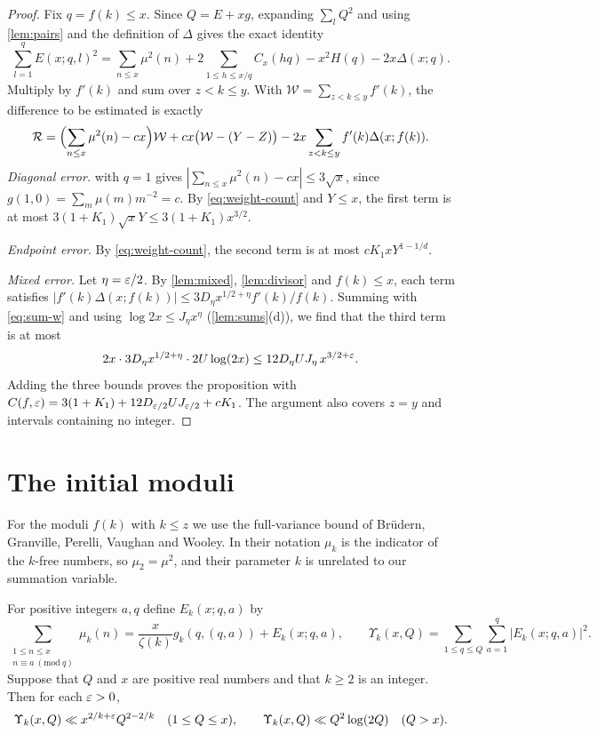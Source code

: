 \begin{proof}
Fix $q=f(k)\le x$. Since $Q=E+xg$, expanding $\sum_lQ^2$ and using \cref{lem:pairs} and the definition of $\Delta$ gives the exact identity
\[
\sum_{l=1}^qE(x;q,l)^2=\sum_{n\le x}\mu^2(n)+2\sum_{1\le h\le x/q}C_x(hq)-x^2H(q)-2x\Delta(x;q).
\]
Multiply by $f'(k)$ and sum over $z<k\le y$. With $\mathcal W=\sum_{z<k\le y}f'(k)$, the difference to be estimated is exactly
\[
\mathcal R=\Bigl(\sum_{n\le x}\mu^2(n)-cx\Bigr)\mathcal W+cx\bigl(\mathcal W-(Y-Z)\bigr)-2x\sum_{z<k\le y}f'(k)\Delta(x;f(k)).
\]
\emph{Diagonal error.}  with $q=1$ gives $|\sum_{n\le x}\mu^2(n)-cx|\le3\sqrt x$, since $g(1,0)=\sum_m\mu(m)m^{-2}=c$. By \eqref{eq:weight-count} and $Y\le x$, the first term is at most $3(1+K_1)\sqrt xY\le3(1+K_1)x^{3/2}$.

\emph{Endpoint error.} By \eqref{eq:weight-count}, the second term is at most $cK_1xY^{1-1/d}$.

\emph{Mixed error.} Let $\eta=\varepsilon/2$. By \cref{lem:mixed}, \cref{lem:divisor} and $f(k)\le x$, each term satisfies $|f'(k)\Delta(x;f(k))|\le3D_\eta x^{1/2+\eta}f'(k)/f(k)$. Summing with \eqref{eq:sum-w} and using $\log2x\le J_\eta x^\eta$ (\cref{lem:sums}(d)), we find that the third term is at most
\[
2x\cdot3D_\eta x^{1/2+\eta}\cdot2U\log(2x)\le12D_\eta UJ_\eta\,x^{3/2+\varepsilon}.
\]
Adding the three bounds proves the proposition with $C(f,\varepsilon)=3(1+K_1)+12D_{\varepsilon/2}UJ_{\varepsilon/2}+cK_1$. The argument also covers $z=y$ and intervals containing no integer.
\end{proof}

\section{The initial moduli}

For the moduli $f(k)$ with $k\le z$ we use the full-variance bound of Brüdern, Granville, Perelli, Vaughan and Wooley. In their notation $\mu_k$ is the indicator of the $k$-free numbers, so $\mu_2=\mu^2$, and their parameter $k$ is unrelated to our summation variable.

\begin{quoted}\label{quoted:bgpvw}
For positive integers $a,q$ define $E_k(x;q,a)$ by
\[
\sum_{\substack{1\le n\le x\\n\equiv a\ (\mathrm{mod}\ q)}}\mu_k(n)=\frac x{\zeta(k)}g_k(q,(q,a))+E_k(x;q,a),
\qquad
\Upsilon_k(x,Q)=\sum_{1\le q\le Q}\sum_{a=1}^q|E_k(x;q,a)|^2.
\]
Suppose that $Q$ and $x$ are positive real numbers and that $k\ge2$ is an integer. Then for each $\varepsilon>0$,
\[
\Upsilon_k(x,Q)\ll x^{2/k+\varepsilon}Q^{2-2/k}\quad(1\le Q\le x),\qquad\Upsilon_k(x,Q)\ll Q^2\log(2Q)\quad(Q>x).
\]
\end{quoted}

